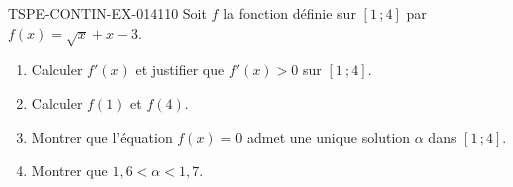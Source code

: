 \begin{exercice}{TSPE-CONTIN-EX-014}{1}{10}
Soit $f$ la fonction définie sur $[1\,;4]$ par $f(x) = \sqrt{x} + x - 3$.
\begin{enumerate}
  \item Calculer $f'(x)$ et justifier que $f'(x) > 0$ sur $[1\,;4]$.
  \item Calculer $f(1)$ et $f(4)$.
  \item Montrer que l'équation $f(x) = 0$ admet une unique solution $\alpha$ dans $[1\,;4]$.
  \item Montrer que $1{,}6 < \alpha < 1{,}7$.
\end{enumerate}
\end{exercice}
